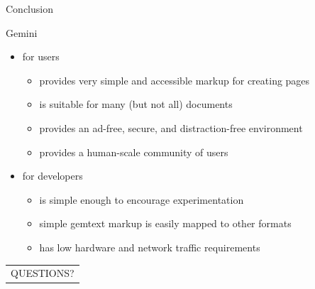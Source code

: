 \documentclass[presentation, 11pt,  aspectratio=169]{beamer}
\begin{document}
\begin{frame}[label={sec:orgf254bcb}]{Conclusion}
\begin{block}{Gemini}
\begin{itemize}
\item \alert{for users}\\
\begin{itemize}
\item provides very simple and accessible markup for creating pages\\
\item is suitable for many (but not all) documents\\
\item provides an ad-free, secure, and distraction-free environment\\
\item provides a human-scale community of users\\
\end{itemize}

\item \alert{for developers}\\
\begin{itemize}
\item is simple enough to encourage experimentation\\
\item simple gemtext markup is easily mapped to other formats\\
\item has low hardware and network traffic requirements\\
\end{itemize}
\end{itemize}
\end{block}
\begin{block}{}
\begin{center}
\begin{tabular}{c}
QUESTIONS?\\
\end{tabular}
\end{center}
\end{block}
\end{frame}
\end{document}
